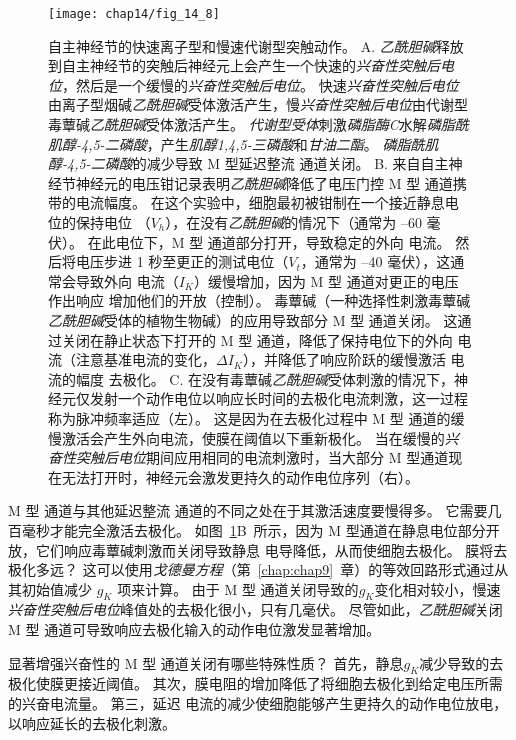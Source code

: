 \begin{figure}[htbp]
	\centering
	\texttt{[image: chap14/fig\_14\_8]}
	\caption{自主神经节的快速离子型和慢速代谢型突触动作。
		A. \textit{乙酰胆碱}释放到自主神经节的突触后神经元上会产生一个快速的\textit{兴奋性突触后电位}，然后是一个缓慢的\textit{兴奋性突触后电位}。
		快速\textit{兴奋性突触后电位}由离子型烟碱\textit{乙酰胆碱}受体激活产生，慢\textit{兴奋性突触后电位}由代谢型毒蕈碱\textit{乙酰胆碱}受体激活产生。
		\textit{代谢型受体}刺激\textit{磷脂酶C}水解\textit{磷脂酰肌醇-4,5-二磷酸}，产生\textit{肌醇1,4,5-三磷酸}和\textit{甘油二酯}。
		\textit{磷脂酰肌醇-4,5-二磷酸}的减少导致 M 型延迟整流  通道关闭。
		B. 来自自主神经节神经元的电压钳记录表明\textit{乙酰胆碱}降低了电压门控 M 型  通道携带的电流幅度。
		在这个实验中，细胞最初被钳制在一个接近静息电位的保持电位 （$V_h$），在没有\textit{乙酰胆碱}的情况下（通常为 –60 毫伏）。
		在此电位下，M 型  通道部分打开，导致稳定的外向  电流。
		然后将电压步进 1 秒至更正的测试电位（$V_t$，通常为 –40 毫伏），这通常会导致外向  电流（$I_K$）缓慢增加，因为 M 型  通道对更正的电压作出响应 增加他们的开放（控制）。
		毒蕈碱（一种选择性刺激毒蕈碱\textit{乙酰胆碱}受体的植物生物碱）的应用导致部分 M 型  通道关闭。
		这通过关闭在静止状态下打开的 M 型  通道，降低了保持电位下的外向  电流（注意基准电流的变化，$\Delta I_K$），并降低了响应阶跃的缓慢激活  电流的幅度 去极化\cite{adams1986slow}。
		C. 在没有毒蕈碱\textit{乙酰胆碱}受体刺激的情况下，神经元仅发射一个动作电位以响应长时间的去极化电流刺激，这一过程称为脉冲频率适应（左）。
		这是因为在去极化过程中 M 型  通道的缓慢激活会产生外向电流，使膜在阈值以下重新极化。
		当在缓慢的\textit{兴奋性突触后电位}期间应用相同的电流刺激时，当大部分 M 型通道现在无法打开时，神经元会激发更持久的动作电位序列（右）\cite{adams1986slow}。}
	\label{fig:14_8}
\end{figure}


M 型  通道与其他延迟整流  通道的不同之处在于其激活速度要慢得多。
它需要几百毫秒才能完全激活去极化。
如图~\ref{fig:14_8}B~所示，因为 M 型通道在静息电位部分开放，它们响应毒蕈碱刺激而关闭导致静息  电导降低，从而使细胞去极化。
膜将去极化多远？
这可以使用\textit{戈德曼方程}（第~\ref{chap:chap9}~章）的等效回路形式通过从其初始值减少 $g_K$ 项来计算。
由于 M 型  通道关闭导致的$g_K$变化相对较小，慢速\textit{兴奋性突触后电位}峰值处的去极化很小，只有几毫伏。
尽管如此，\textit{乙酰胆碱}关闭 M 型  通道可导致响应去极化输入的动作电位激发显著增加。


显著增强兴奋性的 M 型  通道关闭有哪些特殊性质？
首先，静息$g_K$减少导致的去极化使膜更接近阈值。
其次，膜电阻的增加降低了将细胞去极化到给定电压所需的兴奋电流量。
第三，延迟  电流的减少使细胞能够产生更持久的动作电位放电，以响应延长的去极化刺激。



